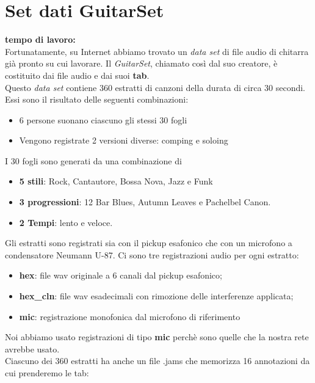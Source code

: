 \section{Set dati GuitarSet}
\textbf{tempo di lavoro:} \\
\newline
Fortunatamente, su Internet abbiamo trovato un \textit{data set} di file audio di chitarra già pronto su cui lavorare. Il \textit{GuitarSet}, chiamato così dal suo creatore, è costituito dai file audio e dai suoi \textbf{tab}.\\
Questo \textit{data set} contiene 360 estratti di canzoni della durata di circa 30 secondi. Essi sono il risultato delle seguenti combinazioni:
\begin{itemize}
	\item 6 persone suonano ciascuno gli stessi 30 fogli
	\item Vengono registrate 2 versioni diverse: comping e soloing
\end{itemize}
I 30 fogli sono generati da una combinazione di
\begin{itemize}
	\item \textbf{5 stili}: Rock, Cantautore, Bossa Nova, Jazz e Funk
	\item \textbf{3 progressioni}: 12 Bar Blues, Autumn Leaves e Pachelbel Canon.
	\item \textbf{2 Tempi}: lento e veloce.
\end{itemize}
Gli estratti sono registrati sia con il pickup esafonico che con un microfono a condensatore Neumann U-87.
Ci sono tre registrazioni audio per ogni estratto:
\begin{itemize}
	\item \textbf{hex}: file wav originale a 6 canali dal pickup esafonico;
	\item \textbf{hex\_cln}: file wav esadecimali con rimozione delle interferenze applicata;
	\item \textbf{mic}: registrazione monofonica dal microfono di riferimento
\end{itemize}
Noi abbiamo usato registrazioni di tipo \textbf{mic} perchè sono quelle che la nostra rete avrebbe usato.\\
\newline
Ciascuno dei 360 estratti ha anche un file .jams che memorizza 16 annotazioni da cui prenderemo le tab:

